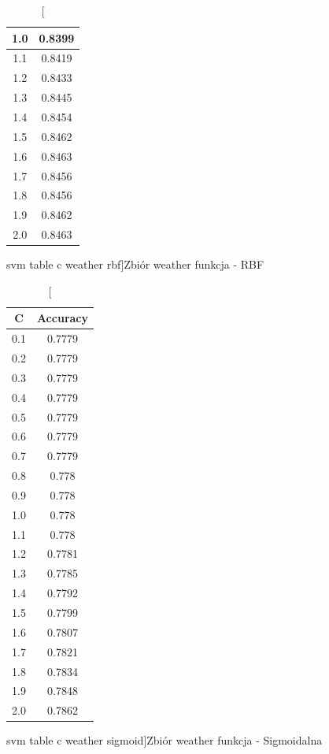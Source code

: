 \documentclass{classrep}
\begin{document}
{{\begin{table}[!htbp]
\begin{minipage}{.3\textwidth}
\begin{tabular}{|c|c|}
1.0 & 0.8399 \\ \hline
1.1 & 0.8419 \\ \hline
1.2 & 0.8433 \\ \hline
1.3 & 0.8445 \\ \hline
1.4 & 0.8454 \\ \hline
1.5 & 0.8462 \\ \hline
1.6 & 0.8463 \\ \hline
1.7 & 0.8456 \\ \hline
1.8 & 0.8456 \\ \hline
1.9 & 0.8462 \\ \hline
2.0 & 0.8463 \\ \hline
        \end{tabular}
        \caption
		[svm table c weather rbf]{Zbiór weather funkcja - RBF}
        \label{svm_table_c_weather_rbf}
    \end{minipage}
    \hfill
    \begin{minipage}{.3\textwidth}
        \centering
        \begin{tabular}{|c|c|}
            \hline
			C & Accuracy \\ \hline
0.1 & 0.7779 \\ \hline
0.2 & 0.7779 \\ \hline
0.3 & 0.7779 \\ \hline
0.4 & 0.7779 \\ \hline
0.5 & 0.7779 \\ \hline
0.6 & 0.7779 \\ \hline
0.7 & 0.7779 \\ \hline
0.8 & 0.778 \\ \hline
0.9 & 0.778 \\ \hline
1.0 & 0.778 \\ \hline
1.1 & 0.778 \\ \hline
1.2 & 0.7781 \\ \hline
1.3 & 0.7785 \\ \hline
1.4 & 0.7792 \\ \hline
1.5 & 0.7799 \\ \hline
1.6 & 0.7807 \\ \hline
1.7 & 0.7821 \\ \hline
1.8 & 0.7834 \\ \hline
1.9 & 0.7848 \\ \hline
2.0 & 0.7862 \\ \hline
        \end{tabular}
        \caption
        [svm table c weather sigmoid]{Zbiór weather funkcja - Sigmoidalna}
        \label{svm_table_c_weather_sigmoid}

\end{minipage}
\end{table}}}
\end{document}
